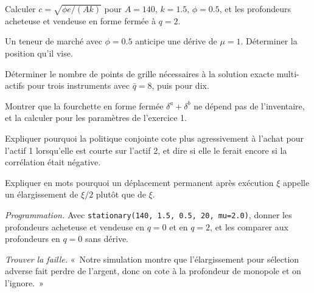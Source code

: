 \begin{exercise}[$\star$]\label{exo:hf:extensions-of-the-inventory-framework:1}
Calculer $c=\sqrt{\phi e/(Ak)}$ pour $A=140$, $k=1.5$, $\phi=0.5$, et les profondeurs acheteuse et vendeuse en forme fermée à $q=2$.
\end{exercise}

\begin{exercise}[$\star$]\label{exo:hf:extensions-of-the-inventory-framework:2}
Un teneur de marché avec $\phi=0.5$ anticipe une dérive de $\mu=1$. Déterminer la position qu'il vise.
\end{exercise}

\begin{exercise}[$\star$]\label{exo:hf:extensions-of-the-inventory-framework:3}
Déterminer le nombre de points de grille nécessaires à la solution exacte multi-actifs pour trois instruments avec $\bar q=8$, puis pour dix.
\end{exercise}

\begin{exercise}[$\star\star$]\label{exo:hf:extensions-of-the-inventory-framework:4}
Montrer que la fourchette en forme fermée $\delta^a+\delta^b$ ne dépend pas de l'inventaire, et la calculer pour les paramètres de l'exercice 1.
\end{exercise}

\begin{exercise}[$\star\star$]\label{exo:hf:extensions-of-the-inventory-framework:5}
Expliquer pourquoi la politique conjointe cote plus agressivement à l'achat pour l'actif 1 lorsqu'elle est courte sur l'actif 2, et dire si elle le ferait encore si la corrélation était négative.
\end{exercise}

\begin{exercise}[$\star\star$]\label{exo:hf:extensions-of-the-inventory-framework:6}
Expliquer en mots pourquoi un déplacement permanent après exécution $\xi$ appelle un élargissement de $\xi/2$ plutôt que de $\xi$.
\end{exercise}

\begin{exercise}[$\star\star\star$]\label{exo:hf:extensions-of-the-inventory-framework:7}
\emph{Programmation.} Avec \texttt{stationary(140, 1.5, 0.5, 20, mu=2.0)}, donner les profondeurs acheteuse et vendeuse en $q=0$ et en $q=2$, et les comparer aux
profondeurs en $q=0$ sans dérive.
\end{exercise}

\begin{exercise}[$\star\star\star$]\label{exo:hf:extensions-of-the-inventory-framework:8}
\emph{Trouver la faille.} «~Notre simulation montre que l'élargissement pour sélection adverse fait perdre de l'argent, donc on cote à la profondeur de monopole et on l'ignore.~»
\end{exercise}

